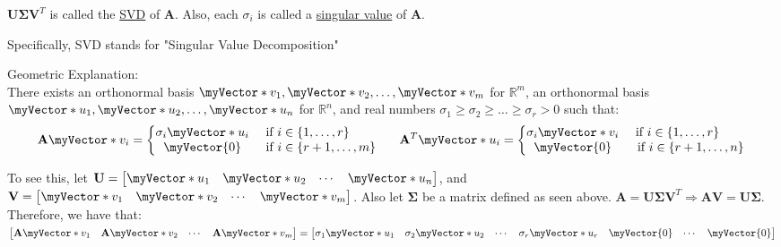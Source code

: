 \documentclass{book}
\newcommand{\myComment}{%
   \color{RawerSienna}%
   \fontsize{12}{14}\selectfont%
}
\newcommand{\teachComment}{
   \color{Orange}%
   \fontsize{12}{14}\selectfont%
}
\newenvironment{myDindent}{%
   \begin{adjustwidth}{5.0em}{0em}%
}{%
   \end{adjustwidth}%
}
\newenvironment{myTindent}{%
   \begin{adjustwidth}{7.5em}{0em}%
}{%
   \end{adjustwidth}%
}
\newcommand{\udefine}[1]{%
   {\setulcolor{Red}%
   \setul{0.14em}{0.07em}%
   \ul{#1}}%
}
\newcommand{\retTwo}{\hfill\bigbreak}
\newcommand{\mVec}[1]{\myVector{#1}}
\newcommand{\mVecAst}[1]{\myVector*{#1}}
\newcommand{\mMat}[1]{\mathbf{#1}}
\begin{document}
   $\mMat{U}\bm{\Sigma}\mMat{V}^T$ is called the \udefine{SVD} of $\mMat{A}$. Also, each $\sigma_i$ is called a \udefine{singular value} of $\mMat{A}$.
   {\begin{myTindent} \myComment
      Specifically, SVD stands for "Singular Value Decomposition" \retTwo
   \end{myTindent}}
   
   {\begin{myDindent} \teachComment
      Geometric Explanation:\\
      There exists an orthonormal basis $\mVecAst{v}_1, \mVecAst{v}_2, \ldots, \mVecAst{v}_m$ for $\mathbb{R}^m$, an orthonormal basis $\mVecAst{u}_1, \mVecAst{u}_2, \ldots, \mVecAst{u}_n$ for $\mathbb{R}^n$, and real numbers $\sigma_1 \geq \sigma_2 \geq \ldots \geq \sigma_r > 0$ such that:
      \[\mMat{A}\mVecAst{v}_i = \left\{
      \begin{matrix}
         \sigma_i\mVecAst{u}_i & \text{ if } i \in \{1,\ldots,r\} \phantom{aaaa} \\
         \mVec{0} & \text{ if } i \in \{r+1,\ldots,m\}
      \end{matrix}\right. \phantom{aaa}
      \mMat{A}^T\mVecAst{u}_i = \left\{
         \begin{matrix}
            \sigma_i\mVecAst{v}_i & \text{ if } i \in \{1,\ldots,r\} \phantom{aaaa} \\
            \mVec{0} & \text{ if } i \in \{r+1,\ldots,n\}
         \end{matrix}\right.\]
      \retTwo
      \retTwo
      
      To see this, let $\mMat{U} = \left[
      \begin{matrix}
         \mVecAst{u}_1 & \mVecAst{u}_2 & \cdots & \mVecAst{u}_n
      \end{matrix}\right]$, and $\mMat{V} = \left[
      \begin{matrix}
         \mVecAst{v}_1 & \mVecAst{v}_2 & \cdots & \mVecAst{v}_m
      \end{matrix}\right]$. Also let $\bm{\Sigma}$ be a matrix defined as seen above. \retTwo 
      $\mMat{A} = \mMat{U}\bm{\Sigma}\mMat{V}^T \Longrightarrow \mMat{A}\mMat{V} = \mMat{U}\bm{\Sigma}$. Therefore, we have that:\\ 
      $\left[\begin{matrix}
         \mMat{A}\mVecAst{v}_1 & \mMat{A}\mVecAst{v}_2 & \cdots & \mMat{A}\mVecAst{v}_m
      \end{matrix}\right] = \left[\begin{matrix}
         \sigma_1\mVecAst{u}_1 & \sigma_2\mVecAst{u}_2 & \cdots & \sigma_r\mVecAst{u}_r & \mVec{0} & \cdots & \mVec{0} 
      \end{matrix}\right]$ \retTwo


\end{myDindent}}
\end{document}
